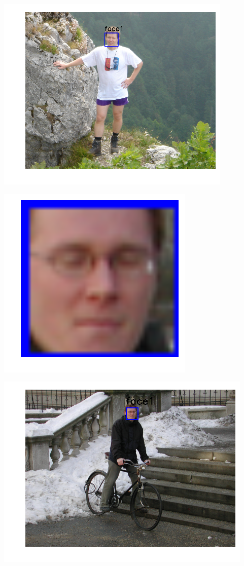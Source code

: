 \includegraphics{facedetection_files/facedetection_59_6.png}

\includegraphics{facedetection_files/facedetection_59_7.png}

\includegraphics{facedetection_files/facedetection_59_8.png}

